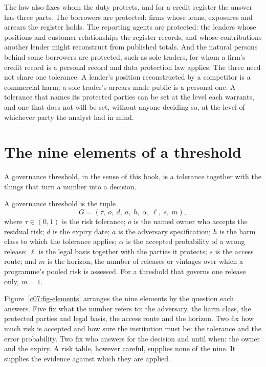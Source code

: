 The law also fixes whom the duty protects, and for a credit register the answer has
three parts. The borrowers are protected: firms whose loans, exposures and arrears
the register holds. The reporting agents are protected: the lenders whose positions
and customer relationships the register records, and whose contributions another
lender might reconstruct from published totals. And the natural persons behind
some borrowers are protected, such as sole traders, for whom a firm's credit record
is a personal record and data protection law applies. The three need not share one
tolerance. A lender's position reconstructed by a competitor is a commercial harm;
a sole trader's arrears made public is a personal one. A tolerance that names its
protected parties can be set at the level each warrants, and one that does not will
be set, without anyone deciding so, at the level of whichever party the analyst had
in mind.

\section{The nine elements of a threshold}\label{c07:sec-elements}

A governance threshold, in the sense of this book, is a tolerance together with the
things that turn a number into a decision.

\begin{definition}\label{c07:def-thresh}
A governance threshold is the tuple
\begin{equation}\label{c07:eq-tuple}
G = (\tau,\ o,\ d,\ a,\ h,\ \alpha,\ \ell,\ s,\ m),
\end{equation}
where $\tau \in (0,1)$ is the risk tolerance; $o$ is the named owner who accepts
the residual risk; $d$ is the expiry date; $a$ is the adversary specification; $h$
is the harm class to which the tolerance applies; $\alpha$ is the accepted
probability of a wrong release; $\ell$ is the legal basis together with the parties
it protects; $s$ is the access route; and $m$ is the horizon, the number of releases
or vintages over which a programme's pooled risk is assessed. For a threshold that
governs one release only, $m = 1$.
\end{definition}

Figure~\ref{c07:fig-elements} arranges the nine elements by the question each
answers. Five fix what the number refers to: the adversary, the harm class, the
protected parties and legal basis, the access route and the horizon. Two fix how
much risk is accepted and how sure the institution must be: the tolerance and the
error probability. Two fix who answers for the decision and until when: the owner
and the expiry. A risk table, however careful, supplies none of the nine. It
supplies the evidence against which they are applied.


